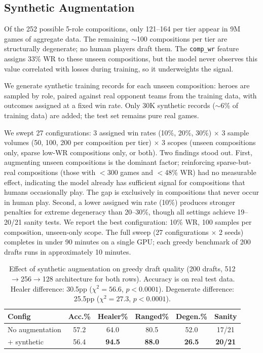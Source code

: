 \documentclass[conference]{IEEEtran}
\begin{document}
\subsection{Synthetic Augmentation}

Of the 252 possible 5-role compositions, only 121--164 per tier appear in 9M games of aggregate data. The remaining $\sim$100 compositions per tier are structurally degenerate; no human players draft them. The \texttt{comp\_wr} feature assigns 33\% WR to these unseen compositions, but the model never observes this value correlated with losses during training, so it underweights the signal.

We generate synthetic training records for each unseen composition: heroes are sampled by role, paired against real opponent teams from the training data, with outcomes assigned at a fixed win rate. Only 30K synthetic records ($\sim$6\% of training data) are added; the test set remains pure real games.

We swept 27 configurations: 3 assigned win rates (10\%, 20\%, 30\%) $\times$ 3 sample volumes (50, 100, 200 per composition per tier) $\times$ 3 scopes (unseen compositions only, sparse low-WR compositions only, or both). Two findings stood out. First, augmenting unseen compositions is the dominant factor; reinforcing sparse-but-real compositions (those with $<$300 games and $<$48\% WR) had no measurable effect, indicating the model already has sufficient signal for compositions that humans occasionally play. The gap is exclusively in compositions that never occur in human play. Second, a lower assigned win rate (10\%) produces stronger penalties for extreme degeneracy than 20--30\%, though all settings achieve 19--20/21 sanity tests. We report the best configuration: 10\% WR, 100 samples per composition, unseen-only scope. The full sweep (27 configurations $\times$ 2 seeds) completes in under 90 minutes on a single GPU; each greedy benchmark of 200 drafts runs in approximately 10 minutes.

\begin{table}[t]
\centering
\caption{Effect of synthetic augmentation on greedy draft quality (200 drafts, 512$\to$256$\to$128 architecture for both rows). Accuracy is on real test data. Healer difference: 30.5pp ($\chi^2\!=\!56.6$, $p\!<\!0.0001$). Degenerate difference: 25.5pp ($\chi^2\!=\!27.3$, $p\!<\!0.0001$).}
\label{tab:synth}
\begin{tabular}{lccccc}
\toprule
Config & Acc.\% & Healer\% & Ranged\% & Degen.\% & Sanity \\
\midrule
No augmentation & 57.2 & 64.0 & 80.5 & 52.0 & 17/21 \\
+ synthetic & 56.4 & \textbf{94.5} & \textbf{88.0} & \textbf{26.5} & \textbf{20/21} \\
\bottomrule
\end{tabular}
\end{table}
\end{document}

